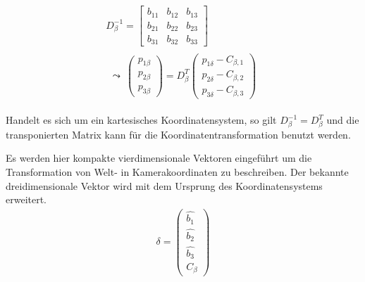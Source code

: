 \begin{gather}
	D_\beta^{-1} = 
	\begin{bmatrix}b_{11} & b_{12} & b_{13}\\
		b_{21} & b_{22} & b_{23}\\
		b_{31} & b_{32} & b_{33}
	\end{bmatrix} \\
	\begin{split}
		\leadsto \: \begin{pmatrix}
			p_{1\beta}\\p_{2\beta}\\ p_{3\beta}
		\end{pmatrix}
		= D_\beta^T 
		\begin{pmatrix}
			p_{1\delta} - C_{\beta,1}\\
			p_{2\delta} - C_{\beta,2}\\
			p_{3\delta} - C_{\beta,3}
		\end{pmatrix}
	\end{split} 
\end{gather}

Handelt es sich um ein kartesisches Koordinatensystem, so gilt $\ensuremath{D_\beta^{-1}}=D_\beta^{T}$ und die transponierten Matrix kann für die Koordinatentransformation benutzt werden. 


Es werden hier  kompakte vierdimensionale Vektoren eingeführt um die  Transformation von Welt- in Kamerakoordinaten  zu beschreiben. Der bekannte dreidimensionale Vektor wird mit dem Ursprung des Koordinatensystems erweitert. 
\begin{gather}
\delta=
\begin{pmatrix}
\hat{b_1}\\
\hat{b_2}\\
\hat{b_3}\\
C_\beta
\end{pmatrix}
\end{gather}


